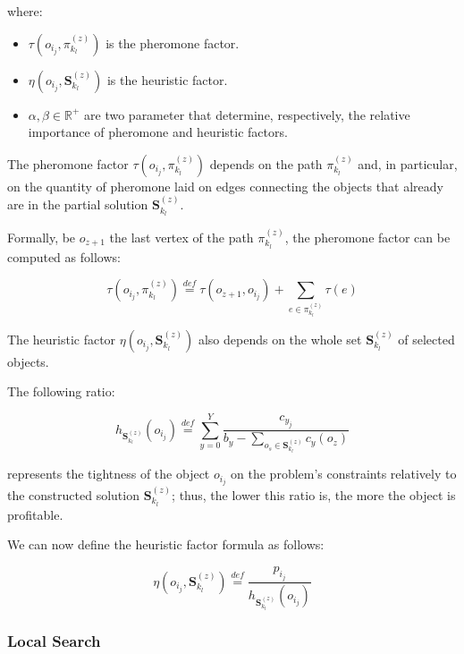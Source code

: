 \documentclass[12pt,a4paper]{report}
\newcommand{\mathDef}{\overset{\textit{def}}{=}}
\newcommand{\Rplus}{\mathbb{R}^+}
\begin{document}
where:

\begin{itemize}
	\item $\tau( o_{i_j}, \pi_{k_l}^{(z)})$ is the pheromone factor.
	\item $\eta( o_{i_j}, \textbf{S}_{k_l}^{(z)})$ is the heuristic factor.
	\item $\alpha, \beta \in \Rplus$ are two parameter that determine, respectively, the relative importance of pheromone and heuristic factors.
\end{itemize}

The pheromone factor $\tau( o_{i_j}, \pi_{k_l}^{(z)})$ depends on the path $\pi_{k_l}^{(z)}$ and, in particular, on the quantity of pheromone laid on edges connecting the objects that already are in the partial solution $\textbf{S}_{k_l}^{(z)}$.

Formally, be $o_{z+1}$ the last vertex of the path $\pi_{k_l}^{(z)}$, the pheromone factor can be computed as follows:

\begin{equation}
	\tau( o_{i_j}, \pi_{k_l}^{(z)}) \mathDef \tau(o_{z+1}, o_{i_j}) + \sum_{e \in \pi_{k_l}^{(z)}} \tau(e) 
\end{equation}

The heuristic factor $\eta( o_{i_j}, \textbf{S}_{k_l}^{(z)})$ also depends on the whole set $\textbf{S}_{k_l}^{(z)}$ of selected objects. 



The following ratio:

\begin{equation}
	h_{\textbf{S}_{k_l}^{(z)}}(o_{i_j}) \mathDef \displaystyle \sum_{y=0}^{Y} \frac{c_{y_j}}{\displaystyle  b_y - \sum_{o_s \in \textbf{S}_{k_l}^{(z)}} c_y(o_z)}
\end{equation}

represents the tightness of the object $o_{i_j}$ on the problem's constraints relatively to the constructed solution $\textbf{S}_{k_l}^{(z)}$; thus, the lower this ratio is, the
more the object is profitable.

We can now define the heuristic factor formula as follows:

\begin{equation}
	\eta( o_{i_j}, \textbf{S}_{k_l}^{(z)}) \mathDef \frac{p_{i_j}}{h_{\textbf{S}_{k_l}^{(z)}}(o_{i_j})}
\end{equation}


\subsubsection{Local Search}
\end{document}
